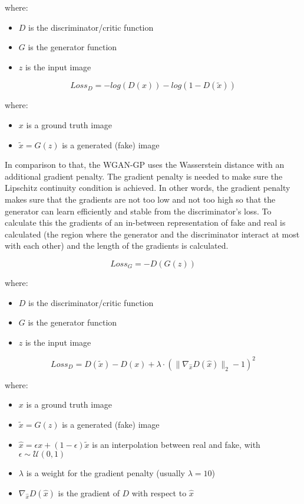 		\noindent where:
		\begin{itemize}[itemsep=1mm, parsep=0pt]
			\item $D$ is the discriminator/critic function
			\item $G$ is the generator function
			\item $z$ is the input image
		\end{itemize}
		
		\begin{equation}
			Loss_D = -log(D(x)) - log(1 - D(\tilde{x}))
		\end{equation}
		
		\noindent where:
		\begin{itemize}[itemsep=1mm, parsep=0pt]
			\item $x$ is a ground truth image
			\item $\tilde{x} = G(z)$ is a generated (fake) image
		\end{itemize}
		
		In comparison to that, the WGAN-GP uses the Wasserstein distance with an additional gradient penalty. The gradient penalty is needed to make sure the Lipschitz continuity condition is achieved. In other words, the gradient penalty makes sure that the gradients are not too low and not too high so that the generator can learn efficiently and stable from the discriminator's loss. To calculate this the gradients of an in-between representation of fake and real is calculated (the region where the generator and the discriminator interact at most with each other) and the length of the gradients is calculated. 
		
		\begin{equation}
			Loss_G = -D( G(z) )
		\end{equation}
		
		\noindent where:
		\begin{itemize}[itemsep=1mm, parsep=0pt]
			\item $D$ is the discriminator/critic function
			\item $G$ is the generator function
			\item $z$ is the input image
		\end{itemize}
		
		\begin{equation}
			Loss_D = D(\tilde{x}) - D(x) + \lambda \cdot \left( \| \nabla_{\hat{x}} D(\hat{x}) \|_2 - 1 \right)^2
		\end{equation}
		
		\noindent where:
		\begin{itemize}[itemsep=1mm, parsep=0pt]
			\item $x$ is a ground truth image
			\item $\tilde{x} = G(z)$ is a generated (fake) image
			\item $\hat{x} = \epsilon x + (1 - \epsilon) \tilde{x}$ is an interpolation between real and fake, with $\epsilon \sim \mathcal{U}(0,1)$
			\item $\lambda$ is a weight for the gradient penalty (usually $\lambda = 10$)
			\item $\nabla_{\hat{x}} D(\hat{x})$ is the gradient of $D$ with respect to $\hat{x}$
		\end{itemize}
		

